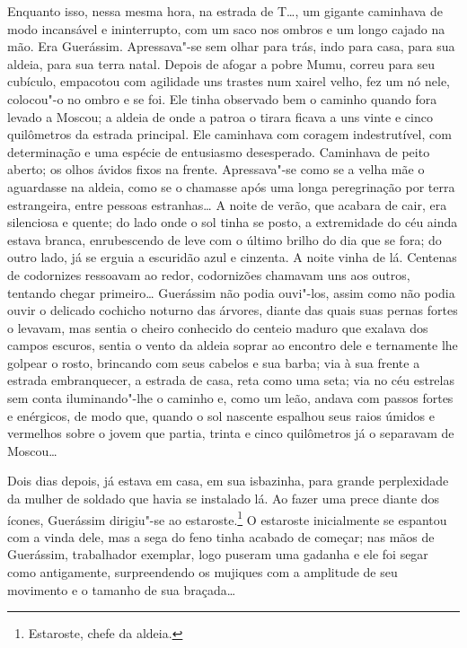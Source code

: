 Enquanto isso, nessa mesma hora, na estrada de T\ldots{}, um gigante
caminhava de modo incansável e ininterrupto, com um saco nos ombros e um
longo cajado na mão. Era Guerássim. Apressava"-se sem olhar para trás,
indo para casa, para sua aldeia, para sua terra natal. Depois de afogar
a pobre Mumu, correu para seu cubículo, empacotou com agilidade uns
trastes num xairel velho, fez um nó nele, colocou"-o no ombro e se foi.
Ele tinha observado bem o caminho quando fora levado a Moscou; a aldeia
de onde a patroa o tirara ficava a uns vinte e cinco quilômetros da
estrada principal. Ele caminhava com coragem indestrutível, com
determinação e uma espécie de entusiasmo desesperado. Caminhava de peito
aberto; os olhos ávidos fixos na frente. Apressava"-se como se a velha
mãe o aguardasse na aldeia, como se o chamasse após uma longa
peregrinação por terra estrangeira, entre pessoas estranhas\ldots{} A noite
de verão, que acabara de cair, era silenciosa e quente; do lado onde o
sol tinha se posto, a extremidade do céu ainda estava branca,
enrubescendo de leve com o último brilho do dia que se fora; do outro
lado, já se erguia a escuridão azul e cinzenta. A noite vinha de lá.
Centenas de codornizes ressoavam ao redor, codornizões chamavam uns aos
outros, tentando chegar primeiro\ldots{} Guerássim não podia ouvi"-los, assim
como não podia ouvir o delicado cochicho noturno das árvores, diante das
quais suas pernas fortes o levavam, mas sentia o cheiro conhecido do
centeio maduro que exalava dos campos escuros, sentia o vento da aldeia
soprar ao encontro dele e ternamente lhe golpear o rosto, brincando com
seus cabelos e sua barba; via à sua frente a estrada embranquecer, a
estrada de casa, reta como uma seta; via no céu estrelas sem conta
iluminando"-lhe o caminho e, como um leão, andava com passos fortes e
enérgicos, de modo que, quando o sol nascente espalhou seus raios úmidos
e vermelhos sobre o jovem que partia, trinta e cinco quilômetros já o
separavam de Moscou\ldots{}

Dois dias depois, já estava em casa, em sua isbazinha, para grande
perplexidade da mulher de soldado que havia se instalado lá. Ao fazer
uma prece diante dos ícones, Guerássim dirigiu"-se ao
estaroste.\footnote{Estaroste, chefe da aldeia.} O estaroste
inicialmente se espantou com a vinda dele, mas a sega do feno tinha
acabado de começar; nas mãos de Guerássim, trabalhador exemplar, logo
puseram uma gadanha e ele foi segar como antigamente, surpreendendo os
mujiques com a amplitude de seu movimento e o tamanho de sua braçada\ldots{}

